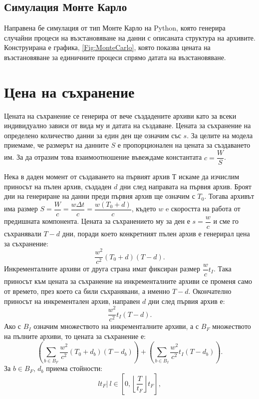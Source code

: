 \documentclass[11pt, a4paper]{article}
\theoremstyle{definition}
\begin{document}
			\subsection{Симулация Монте Карло}
				Направена бе симулация от тип Монте Карло на Python, която генерира случайни процеси на възстановяване на данни с описаната структура на архивите. Конструирана е графика, \ref{Fig:MonteCarlo}, която показва цената на възстановяване за единичните процеси спрямо датата на възстановяване.
\newpage
	\section{Цена на съхранение}\label{Storage_price}
			Цената на съхранение се генерира от вече създадените архиви като за всеки индивидуално зависи от вида му и датата на създаване. Цената за съхранение на определено количество  данни за един ден ще означим със $s$. За целите на модела приемаме, че размерът на данните $S$ е пропорционален на цената за създаването им. За да отразим това взаимоотношение въвеждаме константата $c = \dfrac{W}{S}$.\par
			Нека в даден момент от създаването на първият архив $Т$ искаме да изчислим приносът на пълен архив, създаден $d$ дни след направата на първия архив. Броят дни на генериране на данни преди първия архив ще означим с $T_0$. Тогава архивът има размер $S=\dfrac{W}{c}=\dfrac{w\Delta t}{c} = \dfrac{w(T_0 + d)}{c}$, където $w$ e скоростта на работа от предишната компонента. Цената за съхранението му за ден е $s=\dfrac{w}{c}$ и сме го съхранявали $T-d$ дни, поради което конкретният пълен архив е генерирал цена за съхранение:
			$$
				\dfrac{w^2}{c^2}(T_0 + d)(T-d).
			$$
			Инкременталните архиви от друга страна имат фиксиран размер $\dfrac{w}{c}t_I$. Така приносът към цената за съхранение на инкременталните архиви се променя само от времето, през което са били съхранявани, а именно $T-d$. Окончателно приносът на инкрементален архив, направен $d$ дни след първия архив е: 
			$$
					\dfrac{w^2}{c^2}t_I(T-d).
			$$
			Ако с $B_I$ означим множеството на инкременталните архиви, а с $B_F$ множеството на пълните архиви, то цената за съхранение е:
			\begin{equation}\label{eq:5}
				\left(\displaystyle\sum_{b\in B_F}\dfrac{w^2}{c^2}(T_0 + d_b)(T-d_b)\right) + 	\left(\displaystyle\sum_{b\in B_I}\dfrac{w^2}{c^2}t_I(T-d_b)\right).
			\end{equation}
			За $b\in B_F$, $d_b$ приема стойности:
			$$lt_F|\ l\in \left[0,\left\lfloor\dfrac{T}{t_F}\right\rfloor t_F\right],$$
\end{document}
